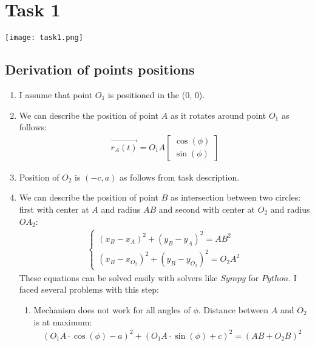 \section{Task 1}

\texttt{[image: task1.png]}

\subsection{Derivation of points positions}

\begin{enumerate}
    \item I assume that point $O_1$ is positioned in the (0, 0).
    \item We can describe the position of point $A$ as it rotates around point $O_1$ as follows:
          \begin{align}
              \vec{r_A(t)} = O_1A \begin{bmatrix}
                  \cos(\phi) \\
                  \sin(\phi)
              \end{bmatrix}
          \end{align}
    \item Position of $O_2$ is $(-c, a)$ as follows from task description.
    \item We can describe the position of point $B$ as intersection between two circles: first with center at $A$ and radius $AB$ and second with center at $O_2$ and radius $OA_2$:
          \begin{align}
              \begin{cases}
                  (x_B - x_A)^2 + (y_B - y_A)^2 = AB^2 \\
                  (x_B - x_{O_2})^2 + (y_B - y_{O_2})^2 = O_2A^2
              \end{cases}
          \end{align}
          These equations can be solved easily with solvers like $Sympy$ for $Python$.
          I faced several problems with this step:
          \begin{enumerate}
              \item Mechanism does not work for all angles of $\phi$.
                    Distance between $A$ and $O_2$ is at maximum:
                    \begin{align}
                        (O_1A \cdot \cos(\phi) - a)^2 + (O_1A \cdot \sin(\phi) + c)^2 = (AB + O_2B)^2
                    \end{align}

\end{enumerate}
\end{enumerate}

